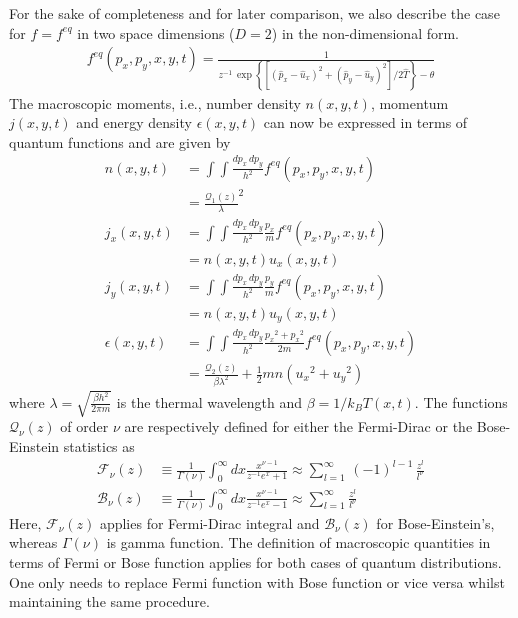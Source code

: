 \documentclass{rsproca}%
\begin{document}
For the sake of completeness and for later comparison, we also describe the case for $f=f^{eq}$ in two space dimensions ($D=2$) in the non-dimensional form.
\begin{align}
f^{eq}(p_x,p_y,x,y,t) =
\frac{1}{z^{-1}\,\exp\left\{ \left[ (\hat{p}_x- \hat{u}_x)^2 + (\hat{p}_y- \hat{u}_y)^2 \right]/2\hat{T} \right\} -\theta}
\end{align}
The macroscopic moments, i.e., number density \(n(x,y,t)\), momentum \(j(x,y,t)\) and energy density \(\epsilon(x,y,t)\) can now be expressed in terms of quantum functions and are given by
\begin{subequations}
\begin {align}
n(x,y,t) &= \int\int{\frac{dp_x\,dp_y}{h^2}f^{eq}(p_x,p_y,x,y,t)}\nonumber \\
&= \frac{\mathcal{Q}_{1}(z)}{\lambda}^2  \\
j_x(x,y,t) &= \int\int{\frac{dp_x\,dp_y}{h^2}\frac{p_x}{m}f^{eq}(p_x,p_y,x,y,t)}\nonumber \\
&= n(x,y,t)u_x(x,y,t)  \\
j_y(x,y,t) &= \int\int{\frac{dp_x\,dp_y}{h^2}\frac{p_y}{m}f^{eq}(p_x,p_y,x,y,t)}\nonumber \\
&= n(x,y,t)u_y(x,y,t)  \\
\epsilon(x,y,t) &= \int\int{\frac{dp_x\,dp_y}{h^2}\frac{{p_x}^2+{p_x}^2}{2m}f^{eq}(p_x,p_y,x,y,t)}\nonumber \\
&= \frac{\mathcal{Q}_{2}(z)}{\beta\lambda^2}+\frac{1}{2}mn({u_x}^2+{u_y}^2)
\end{align}
\end{subequations}
where \(\lambda=\sqrt{\frac{\beta h^2}{2\pi m}}\) is the thermal wavelength and \(\beta=1/k_{B} T(x,t)\).  The functions $\mathcal{Q}_{\nu}(z)$ of order $\nu$ are respectively defined for either the Fermi-Dirac or the Bose-Einstein statistics as
\begin {align}
\mathcal{F}_{\nu}(z)&\equiv \frac{1}{\Gamma(\nu)} \int^{\infty}_{0}{dx\frac{x^{\nu -1}}{z^{-1}e^{x} +1}}\approx\sum^{\infty}_{l=1}\,(-1)^{l-1}\,{\frac{z^l}{l^\nu}}\\
\mathcal{B}_{\nu}(z)&\equiv \frac{1}{\Gamma(\nu)} \int^{\infty}_{0}{dx\frac{x^{\nu-1}}{z^{-1}e^{x}-1}}\approx\sum^{\infty}_{l=1}{\frac{z^l}{l^\nu}}
\end{align}
Here,  \(\mathcal{F}_{\nu}(z)\) applies for Fermi-Dirac integral and \(\mathcal{B}_{\nu}(z)\) for Bose-Einstein's, whereas \(\Gamma(\nu)\) is gamma function. The definition of macroscopic quantities in terms of Fermi or Bose function applies for both cases of quantum distributions. One only needs to replace Fermi function with Bose function or vice versa whilst maintaining the same procedure.
\end{document}
